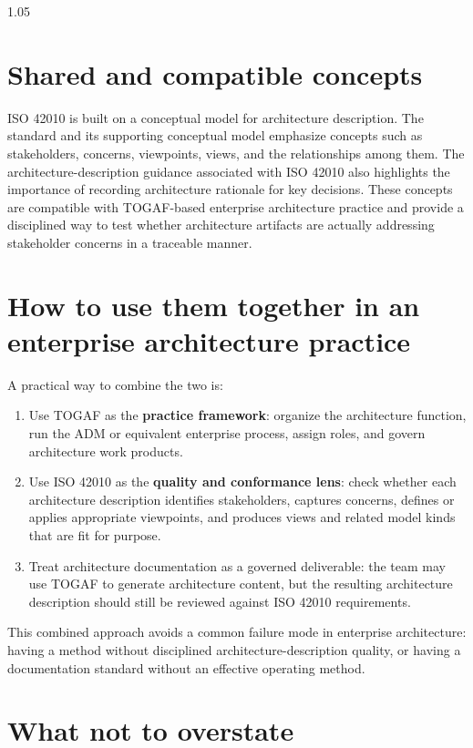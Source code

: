 \documentclass[11pt]{article}
\begin{document}
\begin{spacing}{1.05}
\section{Shared and compatible concepts}

ISO 42010 is built on a conceptual model for architecture description. The standard and its supporting conceptual model emphasize concepts such as stakeholders, concerns, viewpoints, views, and the relationships among them. The architecture-description guidance associated with ISO 42010 also highlights the importance of recording architecture rationale for key decisions. These concepts are compatible with TOGAF-based enterprise architecture practice and provide a disciplined way to test whether architecture artifacts are actually addressing stakeholder concerns in a traceable manner.\cite{conceptualmodel,ads}

\section{How to use them together in an enterprise architecture practice}

A practical way to combine the two is:

\begin{enumerate}[leftmargin=1.5em]
    \item Use TOGAF as the \textbf{practice framework}: organize the architecture function, run the ADM or equivalent enterprise process, assign roles, and govern architecture work products.\cite{togaf,togafadm}
    \item Use ISO 42010 as the \textbf{quality and conformance lens}: check whether each architecture description identifies stakeholders, captures concerns, defines or applies appropriate viewpoints, and produces views and related model kinds that are fit for purpose.\cite{iso42010,conceptualmodel}
    \item Treat architecture documentation as a governed deliverable: the team may use TOGAF to generate architecture content, but the resulting architecture description should still be reviewed against ISO 42010 requirements.\cite{iso42010,togaf}
\end{enumerate}

This combined approach avoids a common failure mode in enterprise architecture: having a method without disciplined architecture-description quality, or having a documentation standard without an effective operating method.

\section{What not to overstate}


\end{spacing}
\end{document}
